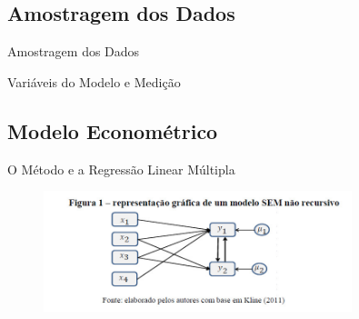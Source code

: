 \documentclass[10pt]{Beamer}
\begin{document}
	\subsection{Amostragem dos Dados}
	
\begin{frame}{Amostragem dos Dados}
	
\end{frame}


\begin{frame}{Variáveis do Modelo e Medição}
	
\end{frame}


	\subsection{Modelo Econométrico}

\begin{frame}{O Método e a Regressão Linear Múltipla}
	

\begin{figure}[h]
	\centering
	\includegraphics[width=0.8\textwidth]{SEM}
\end{figure}

\end{frame}
\end{document}
